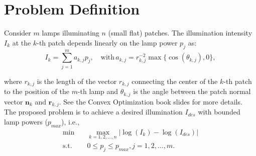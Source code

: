 \documentclass[11pt,a4paper]{article}
\begin{document}
\section{Problem Definition}

Consider $m$ lamps illuminating $n$ (small flat) patches. The illumination intensity $I_k$ at the $k$-th patch depends linearly on the lamp power $p_j$ as:
\begin{equation*}
    I_k = \displaystyle \sum_{j=1}^{m}a_{k,j}p_j, \quad \text{with} \, a_{k,j} = r_{k,j}^{-2}\max\{\cos(\theta_{k,j}),0\},
\end{equation*}

where $r_{k,j}$ is the length of the vector $r_{k,j}$ connecting the center of the $k$-th patch to the position of the $m$-th lamp and $\theta_{k,j}$ is the angle between the patch normal vector $\mathbf{n}_k$ and $\mathbf{r}_{k,j}$. See the Convex Optimization book slides for more details.\\

The proposed problem is to achieve a desired illumination $I_{des}$ with bounded lamp powers ($p_{max}$), i.e.,
\begin{equation}
    \begin{aligned}
        \min & \quad \underset{k=1,2,\dots,n}{\max}\vert \log{(I_k)} - \log{(I_{des})} \vert \\
        \text{s.t.} & \quad 0 \leq p_j \leq p_{max}, j = 1, 2, \dots, m.
    \end{aligned}\label{eq:original-cost}
\end{equation}
\end{document}
